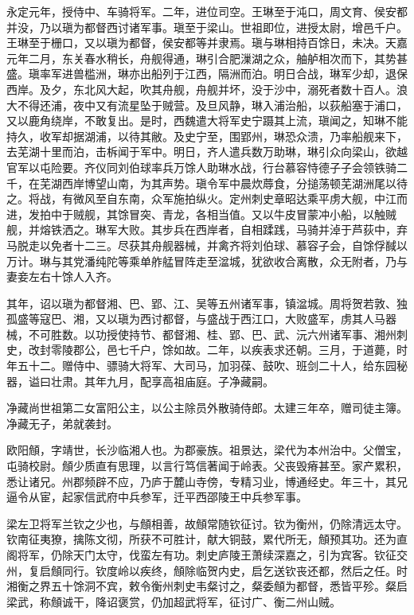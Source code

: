 \documentclass[]{article}
\begin{document}
永定元年，授侍中、车骑将军。二年，进位司空。王琳至于沌口，周文育、侯安都并没，乃以瑱为都督西讨诸军事。瑱至于梁山。世祖即位，进授太尉，增邑千户。王琳至于栅口，又以瑱为都督，侯安都等并隶焉。瑱与琳相持百馀日，未决。天嘉元年二月，东关春水稍长，舟舰得通，琳引合肥漅湖之众，舳舻相次而下，其势甚盛。瑱率军进兽槛洲，琳亦出船列于江西，隔洲而泊。明日合战，琳军少却，退保西岸。及夕，东北风大起，吹其舟舰，舟舰并坏，没于沙中，溺死者数十百人。浪大不得还浦，夜中又有流星坠于贼营。及旦风静，琳入浦治船，以荻船塞于浦口，又以鹿角绕岸，不敢复出。是时，西魏遣大将军史宁蹑其上流，瑱闻之，知琳不能持久，收军却据湖浦，以待其敝。及史宁至，围郢州，琳恐众溃，乃率船舰来下，去芜湖十里而泊，击柝闻于军中。明日，齐人遣兵数万助琳，琳引众向梁山，欲越官军以屯险要。齐仪同刘伯球率兵万馀人助琳水战，行台慕容恃德子子会领铁骑二千，在芜湖西岸博望山南，为其声势。瑱令军中晨炊蓐食，分搥荡顿芜湖洲尾以待之。将战，有微风至自东南，众军施拍纵火。定州刺史章昭达乘平虏大舰，中江而进，发拍中于贼舰，其馀冒突、青龙，各相当值。又以牛皮冒蒙冲小船，以触贼舰，并熔铁洒之。琳军大败。其步兵在西岸者，自相蹂践，马骑并淖于芦荻中，弃马脱走以免者十二三。尽获其舟舰器械，并禽齐将刘伯球、慕容子会，自馀俘馘以万计。琳与其党潘纯陀等乘单舴艋冒阵走至湓城，犹欲收合离散，众无附者，乃与妻妾左右十馀人入齐。

其年，诏以瑱为都督湘、巴、郢、江、吴等五州诸军事，镇湓城。周将贺若敦、独孤盛等寇巴、湘，又以瑱为西讨都督，与盛战于西江口，大败盛军，虏其人马器械，不可胜数。以功授使持节、都督湘、桂、郢、巴、武、沅六州诸军事、湘州刺史，改封零陵郡公，邑七千户，馀如故。二年，以疾表求还朝。三月，于道薨，时年五十二。赠侍中、骠骑大将军、大司马，加羽葆、鼓吹、班剑二十人，给东园秘器，谥曰壮肃。其年九月，配享高祖庙庭。子净藏嗣。

净藏尚世祖第二女富阳公主，以公主除员外散骑侍郎。太建三年卒，赠司徒主簿。净藏无子，弟就袭封。

欧阳頠，字靖世，长沙临湘人也。为郡豪族。祖景达，梁代为本州治中。父僧宝，屯骑校尉。頠少质直有思理，以言行笃信著闻于岭表。父丧毁瘠甚至。家产累积，悉让诸兄。州郡频辟不应，乃庐于麓山寺傍，专精习业，博通经史。年三十，其兄逼令从宦，起家信武府中兵参军，迁平西邵陵王中兵参军事。

梁左卫将军兰钦之少也，与頠相善，故頠常随钦征讨。钦为衡州，仍除清远太守。钦南征夷獠，擒陈文彻，所获不可胜计，献大铜鼓，累代所无，頠预其功。还为直阁将军，仍除天门太守，伐蛮左有功。刺史庐陵王萧续深嘉之，引为宾客。钦征交州，复启頠同行。钦度岭以疾终，頠除临贺内史，启乞送钦丧还都，然后之任。时湘衡之界五十馀洞不宾，敕令衡州刺史韦粲讨之，粲委頠为都督，悉皆平殄。粲启梁武，称頠诚干，降诏褒赏，仍加超武将军，征讨广、衡二州山贼。
\end{document}
